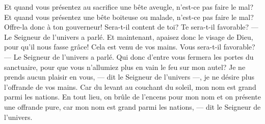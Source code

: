 Et quand vous présentez au sacrifice une bête aveugle,
	n’est-ce pas faire le mal?
Et quand vous présentez une bête boiteuse ou malade,
	n’est-ce pas faire le mal?
Offre-la donc à ton gouverneur!
	Sera-t-il content de toi? Te sera-t-il favorable?
	--- Le Seigneur de l’univers a parlé.
Et maintenant, apaisez donc le visage de Dieu, pour qu’il nous fasse grâce!
	Cela est venu de vos mains.
Vous sera-t-il favorable? --- Le Seigneur de l’univers a parlé.
Qui donc d’entre vous fermera les portes du sanctuaire,
	pour que vous n’allumiez plus en vain le feu sur mon autel?
Je ne prends aucun plaisir en vous, --- dit le Seigneur de l’univers ---,
	je ne désire plus l’offrande de vos mains.
Car du levant au couchant du soleil, mon nom est grand parmi les nations.
En tout lieu, on brûle de l’encens pour mon nom et on présente une offrande pure,
	car mon nom est grand parmi les nations, --- dit le Seigneur de l’univers.
